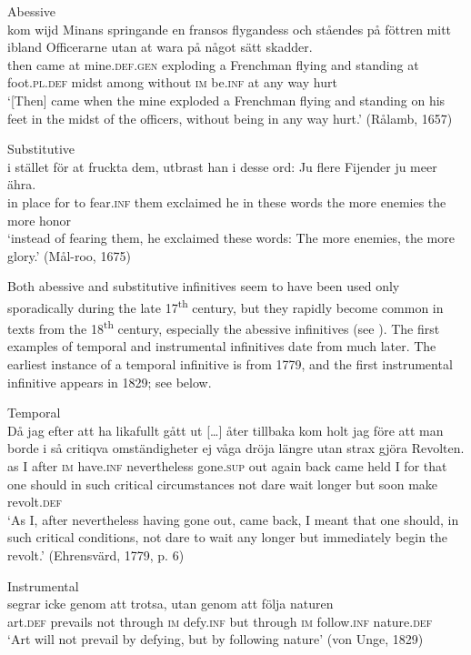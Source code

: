 \documentclass[output=paper]{langscibook}
\begin{document}
\ea
\label{ex:kalm:12}
\ea Abessive\\\label{ex:kalm:12a}
\gll[Då] kom wijd Minans springande en fransos flygandess och ståendes på föttren       mitt ibland Officerarne utan at wara på något sätt skadder.\\
then came at mine.\textsc{def.gen} exploding a Frenchman flying and standing at foot.\textsc{pl.def} midst among without \textsc{im} be.\textsc{inf} at any way hurt \\ 
\glt ‘[Then] came when the mine exploded a Frenchman flying and standing on his feet in the midst of the officers, without being in any way hurt.’ (Rålamb, 1657)

\ex Substitutive\\\label{ex:kalm:12b}
\gll i stället för at fruckta dem, utbrast han i desse ord: Ju flere Fijender ju meer ähra.\\
 in place for to fear.\textsc{inf} them exclaimed he in these words the more enemies the more honor\\
\glt ‘instead of fearing them, he exclaimed these words: The more enemies, the more glory.’ (Mål-roo, 1675)
\z 
\z 


Both abessive and substitutive infinitives seem to have been used only sporadically during the late 17\textsuperscript{th} century, but they rapidly become common in texts from the 18\textsuperscript{th} century, especially the abessive infinitives (see \citealt[129–130]{Kalm2016Satsekvivalenta}). The first examples of temporal and instrumental infinitives date from much later. The earliest instance of a temporal infinitive is from 1779, and the first instrumental infinitive appears in 1829; see  below.  

\ea
\label{ex:kalm:13}
\ea Temporal\label{ex:kalm:13a}\\
\gll Då jag efter att ha likafullt gått {ut […]} åter tillbaka kom holt jag före att man borde i så critiqva omständigheter ej våga dröja längre utan strax gjöra Revolten.\\
as I after \textsc{im} have.\textsc{inf} nevertheless gone.\textsc{sup} out again back came held I for that one should in such critical circumstances not dare wait longer but soon make revolt.\textsc{def}\\
\glt ‘As I, after nevertheless having gone out, came back, I meant that one should, in such critical conditions, not dare to wait any longer but immediately begin the revolt.’ (Ehrensvärd, 1779, p. 6)

\ex Instrumental\label{ex:kalm:13b}\\
 segrar icke genom att trotsa, utan genom att följa naturen\\
art.\textsc{def} prevails not through \textsc{im} defy.\textsc{inf} but through \textsc{im} follow.\textsc{inf} nature.\textsc{def}\\
\glt ‘Art will not prevail by defying, but by following nature’ (von Unge, 1829)
\z 
\z 
\end{document}
